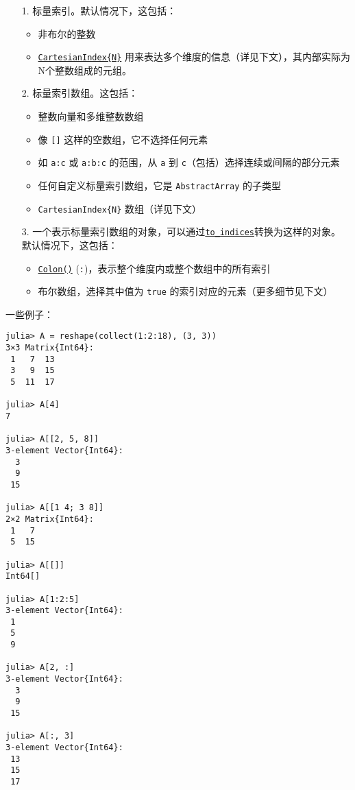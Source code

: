\begin{itemize}
\item[1. ] 标量索引。默认情况下，这包括：

\begin{itemize}
\item 非布尔的整数


\item \hyperlink{4571802376991525093}{\texttt{CartesianIndex\{N\}}} 用来表达多个维度的信息（详见下文），其内部实际为 N个整数组成的元组。

\end{itemize}

\item[2. ] 标量索引数组。这包括：

\begin{itemize}
\item 整数向量和多维整数数组


\item 像 \texttt{[]} 这样的空数组，它不选择任何元素


\item 如 \texttt{a:c} 或 \texttt{a:b:c} 的范围，从 \texttt{a} 到 \texttt{c}（包括）选择连续或间隔的部分元素


\item 任何自定义标量索引数组，它是 \texttt{AbstractArray} 的子类型


\item \texttt{CartesianIndex\{N\}} 数组（详见下文）

\end{itemize}

\item[3. ] 一个表示标量索引数组的对象，可以通过\hyperlink{10027537986402266830}{\texttt{to\_indices}}转换为这样的对象。 默认情况下，这包括：

\begin{itemize}
\item \hyperlink{13649361117037263099}{\texttt{Colon()}} (\texttt{:})，表示整个维度内或整个数组中的所有索引


\item 布尔数组，选择其中值为 \texttt{true} 的索引对应的元素（更多细节见下文）

\end{itemize}
\end{itemize}


一些例子：




\begin{verbatim}
julia> A = reshape(collect(1:2:18), (3, 3))
3×3 Matrix{Int64}:
 1   7  13
 3   9  15
 5  11  17

julia> A[4]
7

julia> A[[2, 5, 8]]
3-element Vector{Int64}:
  3
  9
 15

julia> A[[1 4; 3 8]]
2×2 Matrix{Int64}:
 1   7
 5  15

julia> A[[]]
Int64[]

julia> A[1:2:5]
3-element Vector{Int64}:
 1
 5
 9

julia> A[2, :]
3-element Vector{Int64}:
  3
  9
 15

julia> A[:, 3]
3-element Vector{Int64}:
 13
 15
 17
\end{verbatim}



